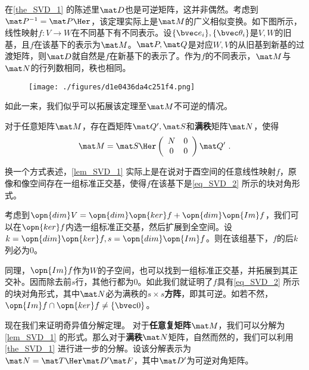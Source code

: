 在\autoref{the_SVD_1} 的陈述里$\mat D$也是可逆矩阵，这并非偶然。考虑到$\mat P^{-1}=\mat P\Her $，该定理实际上是$\mat M$的广义相似变换。如下图所示，线性映射$f:V\rightarrow W$在不同基下有不同表示。设$\{\bvec e_i\},\{\bvec \theta_i\}$是$V,W$的旧基，且$f$在该基下的表示为$\mat M$。$\mat P,\mat Q$是对应$W,V$的从旧基到新基的过渡矩阵，则$\mat D$就自然是$f$在新基下的表示了。作为$f$的不同表示，$\mat M$与$\mat N$的行列数相同，秩也相同。
\begin{figure}[ht]
\centering
\texttt{[image: ./figures/d1e0436da4c251f4.png]}
\caption{} \label{fig_SVD_2}
\end{figure}
如此一来，我们似乎可以拓展该定理至$\mat M$不可逆的情况。

\begin{lemma}{}\label{lem_SVD_1}
对于任意矩阵$\mat M$，存在酉矩阵$\mat Q',\mat S$和\textbf{满秩}矩阵$\mat N$，使得
\begin{equation}\label{eq_SVD_2}
\mat M=\mat S\Her \left(\begin{array}{cc}
N & 0 \\
0 & 0
\end{array}\right) \mat Q'~.
\end{equation}
\end{lemma}


换一个方式表述，\autoref{lem_SVD_1} 实际上是在说对于酉空间的任意线性映射$f$，原像和像空间存在一组标准正交基，使得$f$在该基下是\autoref{eq_SVD_2} 所示的块对角形式。

考虑到$\opn{dim}V=\opn{dim}\opn{ker}f+\opn{dim}\opn{Im}f$，我们可以在$\opn{ker}f$内选一组标准正交基，然后扩展到全空间。设$k=\opn{dim}\opn{ker}f,s=\opn{dim}\opn{Im}f$。则在该组基下，$f$的后$k$列必为$0$。

同理，$\opn{Im}f$作为$W$的子空间，也可以找到一组标准正交基，并拓展到其正交补。因而除去前$s$行，其他行都为$0$。如此我们就证明了$f$具有\autoref{eq_SVD_2} 所示的块对角形式，其中$\mat N$必为满秩的$s\times s$\textbf{方阵}，即其可逆。如若不然，$\opn{Im}f\cap\opn{ker}f\neq\{\bvec 0\}$。

现在我们来证明奇异值分解定理。
对于\textbf{任意复矩阵}$\mat M$，我们可以分解为\autoref{lem_SVD_1} 的形式。那么对于\textbf{满秩}$\mat N$矩阵，自然而然的，我们可以利用\autoref{the_SVD_1} 进行进一步的分解。设该分解表示为$\mat N=\mat T\Her \mat D'\mat F$，其中$\mat D'$为可逆对角矩阵。

